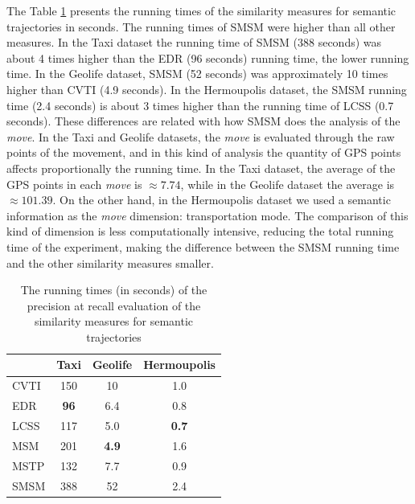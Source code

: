The Table \ref{tab:running_time_semantic} presents the running times of the similarity measures for semantic trajectories in seconds. The running times of SMSM were higher than all other measures. In the Taxi dataset the running time of SMSM (388 seconds) was about 4 times higher than the EDR (96 seconds) running time, the lower running time. In the Geolife dataset, SMSM (52 seconds) was approximately 10 times higher than CVTI (4.9 seconds). In the Hermoupolis dataset, the SMSM running time (2.4 seconds) is about 3 times higher than the running time of LCSS (0.7 seconds). These differences are related with how SMSM does the analysis of the \emph{move}. In the Taxi and Geolife datasets, the \emph{move} is evaluated through the raw points of the movement, and in this kind of analysis the quantity of GPS points affects proportionally the running time. In the Taxi dataset, the average of the GPS points in each \emph{move} is $\approx 7.74$, while in the Geolife dataset the average is $\approx 101.39$. On the other hand, in the Hermoupolis dataset we used a semantic information as the \emph{move} dimension: transportation mode. The comparison of this kind of dimension is less computationally intensive, reducing the total running time of the experiment, making the difference between the SMSM running time and the other similarity measures smaller. %

\begin{table}[ht!]
  \scriptsize
  \centering
  \begin{tabular}{|l|c|c|c|}
  \hline
& Taxi & Geolife & Hermoupolis\\
  \hline
CVTI & 150 & 10 & 1.0\\
EDR & \textbf{96} & 6.4 & 0.8\\
LCSS & 117 & 5.0 & \textbf{0.7} \\
MSM & 201 & \textbf{4.9} & 1.6\\
MSTP & 132 & 7.7 & 0.9\\
SMSM & 388 & 52 & 2.4\\
    \hline
  \end{tabular}
  \caption{The running times (in seconds) of the precision at recall evaluation of the similarity measures for semantic trajectories}
  \label{tab:running_time_semantic}
\end{table}

